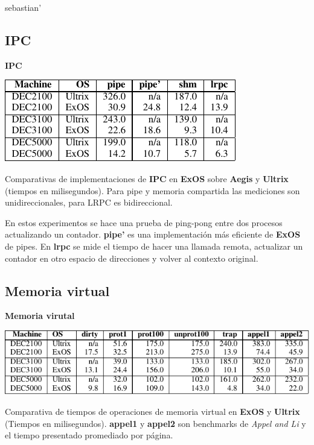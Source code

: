 sebastian'\]\documentclass[10pt]{beamer}
\begin{document}
\subsection{IPC}

\begin{frame}
\textbf{IPC} \\[2em]
\begin{table}
\includegraphics[scale=0.8]{grafico-ipc.pdf}
\caption{Comparativas de implementaciones de \textbf{IPC} en \textbf{ExOS} sobre \textbf{Aegis} y \textbf{Ultrix} (tiempos en milisegundos). Para pipe y memoria compartida las mediciones son unidireccionales, para LRPC es bidireccional.}
\end{table}
En estos experimentos se hace una prueba de ping-pong entre dos procesos actualizando un contador. \textbf{pipe'} es una implementación más eficiente de \textbf{ExOS} de pipes. En \textbf{lrpc} se mide el tiempo de hacer una llamada remota, actualizar un contador en otro espacio de direcciones y volver al contexto original. 
\end{frame}

\subsection{Memoria virtual}

\begin{frame}
 \textbf{Memoria virutal} \\[2em]
\begin{table}
\includegraphics[scale=0.8]{grafico-vm.pdf}
\caption{Comparativa de tiempos de operaciones de memoria virtual en \textbf{ExOS} y \textbf{Ultrix} (Tiempos en milisegundos). \textbf{appel1} y \textbf{appel2} son benchmarks de \emph{Appel and Li} y el tiempo presentado promediado por página.}
\end{table}
\end{frame}
\end{document}
